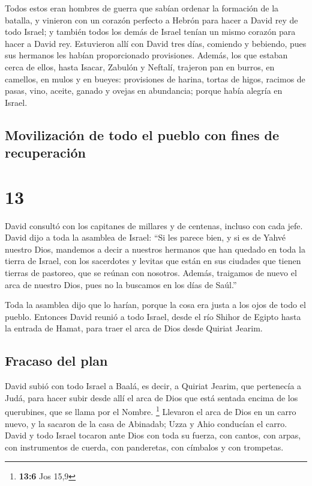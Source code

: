  Todos estos eran hombres de guerra que sabían ordenar la
formación de la batalla, y vinieron con un corazón perfecto a Hebrón
para hacer a David rey de todo Israel; y también todos los demás de
Israel tenían un mismo corazón para hacer a David rey. 
Estuvieron allí con David tres días, comiendo y bebiendo, pues sus
hermanos les habían proporcionado provisiones.  Además,
los que estaban cerca de ellos, hasta Isacar, Zabulón y Neftalí,
trajeron pan en burros, en camellos, en mulos y en bueyes: provisiones
de harina, tortas de higos, racimos de pasas, vino, aceite, ganado y
ovejas en abundancia; porque había alegría en Israel.

\hypertarget{movilizaciuxf3n-de-todo-el-pueblo-con-fines-de-recuperaciuxf3n}{%
\subsection{Movilización de todo el pueblo con fines de
recuperación}\label{movilizaciuxf3n-de-todo-el-pueblo-con-fines-de-recuperaciuxf3n}}

\hypertarget{section-12}{%
\section{13}\label{section-12}}

 David consultó con los capitanes de millares y de
centenas, incluso con cada jefe.  David dijo a toda la
asamblea de Israel: ``Si les parece bien, y si es de Yahvé nuestro Dios,
mandemos a decir a nuestros hermanos que han quedado en toda la tierra
de Israel, con los sacerdotes y levitas que están en sus ciudades que
tienen tierras de pastoreo, que se reúnan con nosotros. 
Además, traigamos de nuevo el arca de nuestro Dios, pues no la buscamos
en los días de Saúl.''

 Toda la asamblea dijo que lo harían, porque la cosa era
justa a los ojos de todo el pueblo.  Entonces David reunió
a todo Israel, desde el río Shihor de Egipto hasta la entrada de Hamat,
para traer el arca de Dios desde Quiriat Jearim.

\hypertarget{fracaso-del-plan}{%
\subsection{Fracaso del plan}\label{fracaso-del-plan}}

 David subió con todo Israel a Baalá, es decir, a Quiriat
Jearim, que pertenecía a Judá, para hacer subir desde allí el arca de
Dios que está sentada encima de los querubines, que se llama por el
Nombre. \footnote{\textbf{13:6} Jos 15,9}  Llevaron el
arca de Dios en un carro nuevo, y la sacaron de la casa de Abinadab;
Uzza y Ahio conducían el carro.  David y todo Israel
tocaron ante Dios con toda su fuerza, con cantos, con arpas, con
instrumentos de cuerda, con panderetas, con címbalos y con trompetas.

